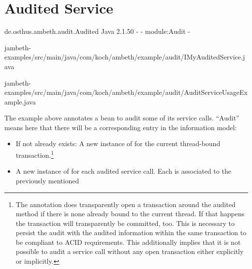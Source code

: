 \section{Audited Service}
\label{feature:AuditedService}
\ClearAPI
\TODO
\feature
	{de.osthus.ambeth.audit.Audited}
	{Java}
	{2.1.50}
	{-}
	{-}
	{module:Audit}
	{-}
	
	{jambeth-examples/src/main/java/com/koch/ambeth/example/audit/IMyAuditedService.java}

	{jambeth-examples/src/main/java/com/koch/ambeth/example/audit/AuditServiceUsageExample.java}

The example above annotates a bean to audit some of its service calls. ``Audit'' means here that there will be a corresponding entry in the information model:

\begin{itemize}
	\item If not already exists: A new instance of  for the current thread-bound transaction.\footnote{The \type{\@Audited} annotation does transparently open a transaction around the audited method if there is none already bound to the current thread. If that happens the transaction will transparently be committed, too. This is necessary to persist the audit with the audited information within the same transaction to be compliant to ACID requirements. This additionally implies that it is not possible to audit a service call without any open transaction either explicitly or implicitly.}
	\item A new instance of  for each audited service call. Each  is associated to the previously mentioned 
\end{itemize}

